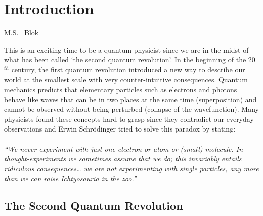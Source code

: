 \graphicspath{{./ch_introduction/figures/}}

\chapter{Introduction}
\label{ch:intro}

\begin{center} 
    \vspace{-1cm} {M.S. ~Blok} 
\end{center}

This is an exciting time to be a quantum physicist since we are in the midst of what has been called `the second quantum revolution'.
In the beginning of the 20$^{th}$ century, the first quantum revolution introduced a new way to describe our world at the smallest scale with very counter-intuitive consequences. Quantum mechanics predicts that elementary particles such as electrons and photons behave like waves that can be in two places at the same time (superposition) and cannot be observed without being perturbed (collapse of the wavefunction). Many physicists found these concepts hard to grasp since they contradict our everyday observations and Erwin Schr\"{o}dinger tried to solve this paradox by stating: 
\\
\\
\textit{``We never experiment with just one electron or atom or (small) molecule. In  thought-experiments we sometimes assume that we do; this invariably entails ridiculous consequences… we are not experimenting with single particles, any more than we can raise Ichtyosauria in the zoo.''}
\\

\section{The Second Quantum Revolution}


\clearpage




